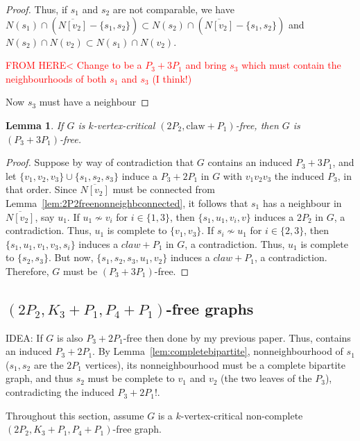 \documentclass[11pt]{article}
\newtheorem{lemma}[theorem]{Lemma}
\theoremstyle{definition}
\newcommand{\forbid}{$(2P_2, K_3+P_1,P_4+P_1)$}
\begin{document}
\begin{proof}
Thus, if $s_1$ and $s_2$ are not comparable, we have $N(s_1)\cap (\overline{N[v_2]}-\{s_1,s_2\})\subset N(s_2)\cap (\overline{N[v_2]}-\{s_1,s_2\})$ and $N(s_2)\cap N(v_2)\subset N(s_1)\cap N(v_2)$.

\textcolor{red}{FROM HERE< Change to be a $P_3+3P_1$ and bring $s_3$ which must contain the neighbourhoods of both $s_1$ and $s_3$ (I think!)} 

Now $s_3$ must have a neighbour 




\end{proof}


\begin{lemma}
If $G$ is $k$-vertex-critical $(2P_2,\text{claw}+P_1)$-free, then $G$ is $(P_3+3 P_1)$-free.
\end{lemma}
\begin{proof}
Suppose by way of contradiction that $G$ contains an induced $P_3+3 P_1$, and let $\{v_1,v_2,v_3\}\cup \{s_1,s_2,s_3\}$ induce a $P_3+2 P_1$ in $G$ with $v_1v_2v_3$ the induced $P_3$, in that order. Since $\overline{N[v_2]}$ must be connected from Lemma~\ref{lem:2P2freenonneighbconnected}, it follows that $s_1$ has a neighbour in $\overline{N[v_2]}$, say $u_1$. If $u_1\nsim v_i$ for $i\in \{1,3\}$, then $\{s_1,u_1,v_i,v\}$ induces a $2P_2$ in $G$, a contradiction. Thus, $u_1$ is complete to $\{v_1,v_3\}$. If $s_i\nsim u_1$ for $i\in\{2,3\}$, then $\{s_1,u_1,v_1,v_3,s_i\}$ induces a $claw+P_1$ in $G$, a contradiction. Thus, $u_1$ is complete to $\{s_2,s_3\}$. But now, $\{s_1,s_2,s_3,u_1,v_2\}$ induces a $claw+P_1$, a contradiction. Therefore, $G$ must be $(P_3+3 P_1)$-free.
\end{proof}



\subsection{\forbid-free graphs}

IDEA: If $G$ is also $P_3+2P_1$-free then done by my previous paper. Thus, contains an induced $P_3+2P_1$. By Lemma~\ref{lem:completebipartite}, nonneighbourhood of $s_1$ ($s_1,s_2$ are the $2P_1$ vertices), its nonneighbourhood must be a complete bipartite graph, and thus $s_2$ must be complete to $v_1$ and $v_2$ (the two leaves of the $P_3$), contradicting the induced $P_3+2P_1$!. 

Throughout this section, assume $G$ is a $k$-vertex-critical non-complete \forbid -free graph.
\end{document}
